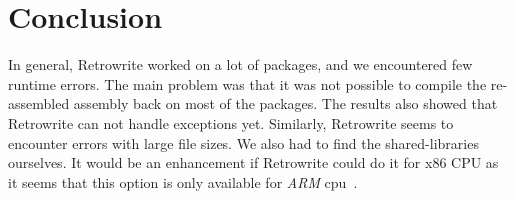 \documentclass[a4paper,11pt,oneside]{report}
\newcommand{\sysname}{Retrowrite\xspace}
\begin{document}
\chapter{Conclusion}

In general, \sysname worked on a lot of packages, and we encountered few runtime
errors. The main problem was that it was not possible to compile the
re-assembled assembly back on most of the packages. The results also showed
that \sysname can not handle exceptions yet. Similarly, \sysname seems to
encounter errors with large file sizes. We also had to find the shared-libraries
ourselves. It would be an enhancement if \sysname could do it for x86 CPU as
it seems that this option is only available for \textit{ARM}
cpu~\cite{retroArm}.

\cleardoublepage
{}
{}
\printbibliography
%
%
\end{document}
